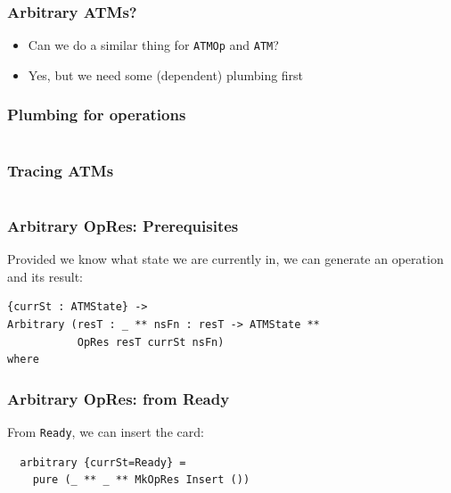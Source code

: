 \documentclass[compress,handout]{beamer}
\begin{document}
\begin{frame}
  \frametitle{Arbitrary ATMs?}

  \begin{itemize}
    \item<1-> Can we do a similar thing for \texttt{ATMOp} and
              \texttt{ATM}?
    \item<2-> Yes, but we need some (dependent) plumbing first
  \end{itemize}

\end{frame}


\begin{frame}[fragile]
  \frametitle{Plumbing for operations}

  \inputminted{Idris}{qc-things/ATM-opres.idr}

\end{frame}


\begin{frame}[fragile]
  \frametitle{Tracing ATMs}

  \inputminted[fontsize=\footnotesize]{Idris}{qc-things/ATM-tracing.idr}

\end{frame}




\begin{frame}[fragile]
  \frametitle{Arbitrary OpRes: Prerequisites}

  Provided we know what state we are currently in, we can generate an operation
  and its result:

  \begin{verbatim}
{currSt : ATMState} ->
Arbitrary (resT : _ ** nsFn : resT -> ATMState **
           OpRes resT currSt nsFn)
where
          \end{verbatim}

\end{frame}


\begin{frame}[fragile]
  \frametitle{Arbitrary OpRes: from Ready}

  From \texttt{Ready}, we can insert the card:

  \begin{verbatim}
  arbitrary {currSt=Ready} =
    pure (_ ** _ ** MkOpRes Insert ())
  \end{verbatim}

\end{frame}
\end{document}
